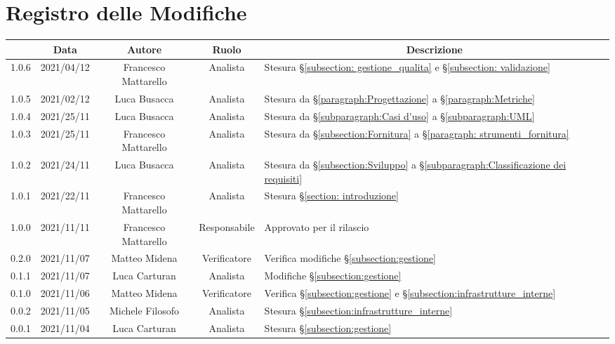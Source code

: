 \thispagestyle{empty}
\section*{Registro delle Modifiche}

\begin{center}
	\renewcommand{\arraystretch}{1.8}
	\begin{longtable}[c]{c | c | c | c | p{5cm}}
		\rowcolor[HTML]{125E28}
		\multicolumn{1}{c}{\color[HTML]{FFFFFF} \textbf{Versione}} & 
		\multicolumn{1}{c}{\color[HTML]{FFFFFF} \textbf{Data}} & 
		\multicolumn{1}{c}{\color[HTML]{FFFFFF} \textbf{Autore}} & 
		\multicolumn{1}{c}{\color[HTML]{FFFFFF} \textbf{Ruolo}} & 
		\multicolumn{1}{c}{\color[HTML]{FFFFFF} \textbf{Descrizione}} \\
		\endhead
		1.0.6 & 2021/04/12 & Francesco Mattarello & Analista & Stesura §\ref{subsection: gestione_qualita} e §\ref{subsection: validazione}\\
		1.0.5 & 2021/02/12 & Luca Busacca & Analista & Stesura da  §\ref{paragraph:Progettazione} a §\ref{paragraph:Metriche} \\
		1.0.4 & 2021/25/11 & Luca Busacca & Analista & Stesura da  §\ref{subparagraph:Casi d'uso} a §\ref{subparagraph:UML} \\
		1.0.3 & 2021/25/11 & Francesco Mattarello & Analista & Stesura da §\ref{subsection:Fornitura} a §\ref{paragraph: strumenti_fornitura} \\
		1.0.2 & 2021/24/11 & Luca Busacca & Analista & Stesura da §\ref{subsection:Sviluppo} a  §\ref{subparagraph:Classificazione dei requisiti} \\
		1.0.1 & 2021/22/11 & Francesco Mattarello & Analista & Stesura §\ref{section: introduzione}\\
		1.0.0 & 2021/11/11 & Francesco Mattarello & Responsabile & Approvato per il rilascio\\
		0.2.0 & 2021/11/07 & Matteo Midena & Verificatore & Verifica modifiche §\ref{subsection:gestione}\\
		0.1.1 & 2021/11/07 & Luca Carturan & Analista & Modifiche §\ref{subsection:gestione}\\
		0.1.0 & 2021/11/06 & Matteo Midena & Verificatore & Verifica  §\ref{subsection:gestione} e  §\ref{subsection:infrastrutture_interne}\\
		0.0.2 & 2021/11/05 & Michele Filosofo & Analista & Stesura §\ref{subsection:infrastrutture_interne}\\
		0.0.1 & 2021/11/04 & Luca Carturan & Analista &Stesura §\ref{subsection:gestione}  \\

	\end{longtable}
\end{center}